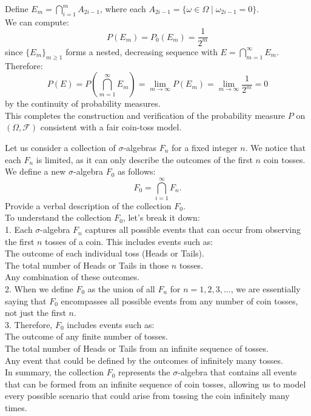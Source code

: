 Define \( E_m = \bigcap_{i=1}^m A_{2i-1} \), where each \( A_{2i-1} = \{\omega \in \Omega \mid \omega_{2i-1} = 0\} \).\\

We can compute:
  \[
  P(E_m) = P_0(E_m) = \frac{1}{2^m}
  \]
since \( \{E_m\}_{m \geq 1} \) forms a nested, decreasing sequence with \( E = \bigcap_{m=1}^{\infty} E_m \).\\

Therefore:
  \[
  P(E) = P\left(\bigcap_{m=1}^{\infty} E_m\right) = \lim_{m \to \infty} P(E_m) = \lim_{m \to \infty} \frac{1}{2^m} = 0
  \]
by the continuity of probability measures.\\

This completes the construction and verification of the probability measure \( P \) on \( (\Omega, \mathcal{F}) \) consistent with a fair coin-toss model.\\

\begin{example}
    Let us consider a collection of $\sigma$-algebras \( F_n \) for a fixed integer \( n \). We notice that each \( F_n \) is limited, as it can only describe the outcomes of the first \( n \) coin tosses. We define a new $\sigma$-algebra \( F_0 \) as follows:
\[
F_0 = \bigcap_{i=1}^{\infty} F_n.
\]
Provide a verbal description of the collection \( F_0 \).\\


To understand the collection \( F_0 \), let's break it down:\\

1. Each \(\sigma\)-algebra \( F_n \) captures all possible events that can occur from observing the first \( n \) tosses of a coin. This includes events such as:\\

The outcome of each individual toss (Heads or Tails).\\
The total number of Heads or Tails in those \( n \) tosses.\\
Any combination of these outcomes.\\

2. When we define \( F_0 \) as the union of all \( F_n \) for \( n = 1, 2, 3, \ldots \), we are essentially saying that \( F_0 \) encompasses all possible events from any number of coin tosses, not just the first \( n \).\\

3. Therefore, \( F_0 \) includes events such as:\\

The outcome of any finite number of tosses.\\
The total number of Heads or Tails from an infinite sequence of tosses.\\
Any event that could be defined by the outcomes of infinitely many tosses.\\

In summary, the collection \( F_0 \) represents the \(\sigma\)-algebra that contains all events that can be formed from an infinite sequence of coin tosses, allowing us to model every possible scenario that could arise from tossing the coin infinitely many times.
\end{example}

